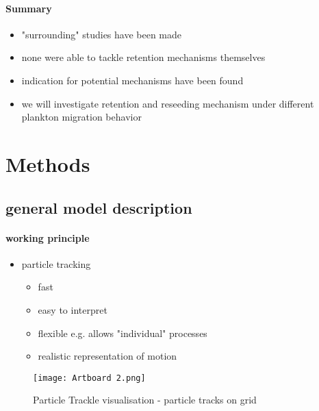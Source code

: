 \paragraph{Summary}
\begin{itemize}
    \item "surrounding" studies have been made
    \item none were able to tackle retention mechanisms themselves
    \item indication for potential mechanisms have been found
    \item we will investigate retention and reseeding mechanism under different plankton migration behavior
\end{itemize}

\section*{Methods}

\subsection*{general model description}
\paragraph{working principle}
\begin{itemize}
    \item particle tracking
    \begin{itemize}
        \item fast
        \item easy to interpret
        \item flexible e.g. allows "individual" processes
        \item realistic representation of motion
    \end{itemize}
\end{itemize}
\begin{figure}
    \texttt{[image: Artboard 2.png]}
    \caption{Particle Trackle visualisation - particle tracks on grid}
\end{figure}

